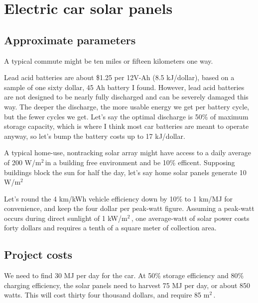 \documentclass[12pt]{article}
\title{}
\author{}
\date{}
\begin{document}
\maketitle

\newcommand{\wmsq}{W/\(\mathrm{m}^2\,\)}
\newcommand{\msq}{\(\mathrm{m}^2\,\)}

\section{Electric car solar panels}

\subsection{Approximate parameters}

A typical commute might be ten miles or fifteen kilometers one way.


Lead acid batteries are about \$1.25 per 12V-Ah (8.5 kJ/dollar), based on a sample of one sixty dollar, 45 Ah battery I found. However, lead acid batteries are not designed to be nearly fully discharged and can be severely damaged this way. The deeper the discharge, the more usable energy we get per battery cycle, but the fewer cycles we get. Let's say the optimal discharge is 50\% of maximum storage capacity, which is where I think most car batteries are meant to operate anyway, so let's bump the battery costs up to 17 kJ/dollar.


A typical home-use, nontracking solar array might have access to a daily average of 200 \wmsq in a building free environment and be 10\% efficent. Supposing buildings block the sun for half the day, let's say home solar panels generate  10 \wmsq
 
Let's round the 4 km/kWh vehicle efficiency down by 10\% to 1 km/MJ for convenience, and keep the four dollar per peak-watt figure. Assuming a peak-watt occurs during direct sunlight of 1 k\wmsq, one average-watt of solar power costs forty dollars and requires a tenth of a square meter of collection area.

\subsection{Project costs}

We need to find 30 MJ per day for the car. At 50\% storage efficiency and 80\% charging efficiency, the solar panels need to harvest 75 MJ per day, or about 850 watts. This will cost thirty four thousand dollars, and require 85 \msq.
\end{document}
